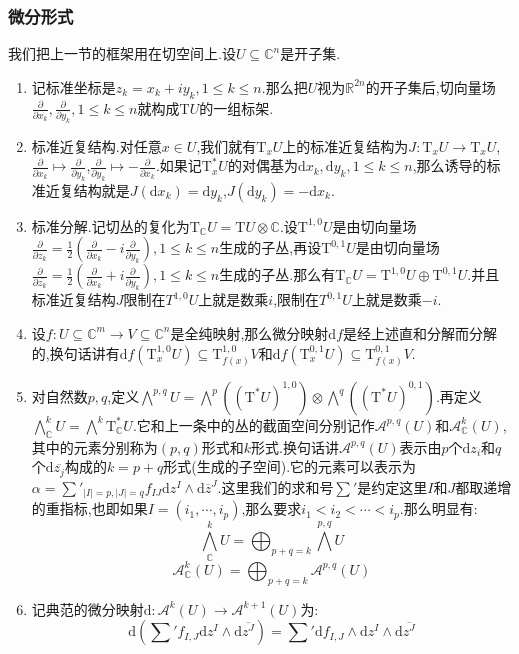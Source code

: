 \newpage
\subsubsection{微分形式}

我们把上一节的框架用在切空间上.设$U\subseteq\mathbb{C}^n$是开子集.
\begin{enumerate}
	\item 记标准坐标是$z_k=x_k+iy_k,1\le k\le n$.那么把$U$视为$\mathbb{R}^{2n}$的开子集后,切向量场$\frac{\partial}{\partial x_k},\frac{\partial}{\partial y_k},1\le k\le n$就构成$\mathrm{T}U$的一组标架.
	\item 标准近复结构.对任意$x\in U$,我们就有$\mathrm{T}_xU$上的标准近复结构为$J:\mathrm{T}_xU\to\mathrm{T}_xU$,$\frac{\partial}{\partial x_k}\mapsto\frac{\partial}{\partial y_k}$,$\frac{\partial}{\partial y_k}\mapsto-\frac{\partial}{\partial x_k}$.如果记$\mathrm{T}^*_xU$的对偶基为$\mathrm{d}x_k,\mathrm{d}y_k,1\le k\le n$,那么诱导的标准近复结构就是$J(\mathrm{d}x_k)=\mathrm{d}y_k$,$J(\mathrm{d}y_k)=-\mathrm{d}x_k$.
	\item 标准分解.记切丛的复化为$\mathrm{T}_{\mathbb{C}}U=\mathrm{T}U\otimes\mathbb{C}$.设$\mathrm{T}^{1,0}U$是由切向量场$\frac{\partial}{\partial z_k}=\frac{1}{2}\left(\frac{\partial}{\partial x_k}-i\frac{\partial}{\partial y_k}\right),1\le k\le n$生成的子丛,再设$\mathrm{T}^{0,1}U$是由切向量场$\frac{\partial}{\partial\overline{z_k}}=\frac{1}{2}\left(\frac{\partial}{\partial x_k}+i\frac{\partial}{\partial y_k}\right),1\le k\le n$生成的子丛.那么有$\mathrm{T}_{\mathbb{C}}U=\mathrm{T}^{1,0}U\oplus\mathrm{T}^{0,1}U$.并且标准近复结构$J$限制在$T^{1,0}U$上就是数乘$i$,限制在$T^{0,1}U$上就是数乘$-i$.
	\item 设$f:U\subseteq\mathbb{C}^m\to V\subseteq\mathbb{C}^n$是全纯映射,那么微分映射$\mathrm{d}f$是经上述直和分解而分解的,换句话讲有$\mathrm{d}f(\mathrm{T}_x^{1,0}U)\subseteq\mathrm{T}_{f(x)}^{1,0}V$和$\mathrm{d}f(\mathrm{T}_x^{0,1}U)\subseteq\mathrm{T}_{f(x)}^{0,1}V$.
	\item 对自然数$p,q$,定义$\bigwedge^{p,q}U=\bigwedge^p\left((\mathrm{T}^*U)^{1,0}\right)\otimes\bigwedge^q\left((\mathrm{T}^*U)^{0,1}\right)$.再定义$\bigwedge^k_{\mathbb{C}}U=\bigwedge^k\mathrm{T}_{\mathbb{C}}^*U$.它和上一条中的丛的截面空间分别记作$\mathscr{A}^{p,q}(U)$和$\mathscr{A}^k_{\mathbb{C}}(U)$,其中的元素分别称为$(p,q)$形式和$k$形式.换句话讲$\mathscr{A}^{p,q}(U)$表示由$p$个$\mathrm{d}z_i$和$q$个$\mathrm{d}\overline{z_j}$构成的$k=p+q$形式(生成的子空间).它的元素可以表示为$\alpha=\sum'_{|I|=p,|J|=q}f_{IJ}\mathrm{d}z^I\wedge\mathrm{d}\overline{z}^J$.这里我们的求和号$\sum'$是约定这里$I$和$J$都取递增的重指标,也即如果$I=(i_1,\cdots,i_p)$,那么要求$i_1<i_2<\cdots<i_p$.那么明显有:
	$$\bigwedge_{\mathbb{C}}^kU=\bigoplus_{p+q=k}\bigwedge^{p,q}U$$
	$$\mathscr{A}^k_{\mathbb{C}}(U)=\bigoplus_{p+q=k}\mathscr{A}^{p,q}(U)$$
	\item 记典范的微分映射$\mathrm{d}:\mathscr{A}^k(U)\to\mathscr{A}^{k+1}(U)$为:
	$$\mathrm{d}\left(\sum\nolimits'f_{I,J}\mathrm{d}z^I\wedge\mathrm{d}\overline{z^J}\right)=\sum\nolimits'\mathrm{d}f_{I,J}\wedge\mathrm{d}z^I\wedge\mathrm{d}\overline{z^J}$$
	

\end{enumerate}
